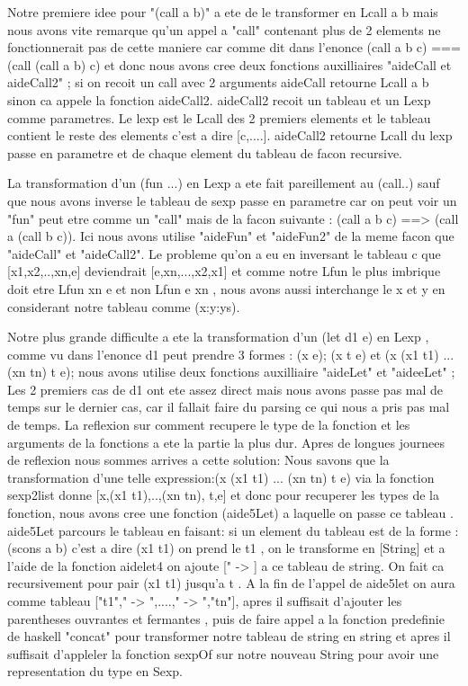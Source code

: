 \documentclass{article}
\begin{document}
Notre premiere idee pour "(call a b)" a ete de le transformer en Lcall a b mais nous avons vite remarque qu'un appel a "call" contenant plus de 2 elements ne fonctionnerait pas de cette maniere car comme dit dans l'enonce (call a b c) === (call (call a b) c)  et donc nous avons cree deux fonctions auxilliaires "aideCall et aideCall2" ; si on recoit un call avec 2 arguments aideCall retourne Lcall a b sinon ca appele la fonction aideCall2. aideCall2 recoit un tableau et un Lexp comme parametres. Le lexp est le Lcall des 2 premiers elements et le tableau contient le reste des elements c'est a dire [c,....]. aideCall2 retourne Lcall du lexp passe en parametre et de chaque element du tableau de facon recursive.  \vspace{.7 cm}

La transformation d'un (fun ...) en Lexp a ete fait pareillement au (call..) sauf que nous avons inverse le tableau de sexp passe en parametre car on peut voir un "fun" peut etre comme un "call" mais de la facon suivante : (call a b c) ==> (call a (call b c)). Ici nous avons utilise "aideFun" et "aideFun2" de la meme facon que "aideCall" et "aideCall2". Le probleme qu'on a eu en inversant le tableau c que [x1,x2,..,xn,e] deviendrait [e,xn,...,x2,x1] et comme notre Lfun le plus imbrique doit etre Lfun xn e et non Lfun e xn , nous avons aussi interchange le x et y en considerant notre tableau comme (x:y:ys). \vspace{.7 cm}

Notre plus grande difficulte a ete la transformation d'un (let d1 e) en Lexp , comme vu dans l'enonce d1 peut prendre 3 formes : (x e); (x t e) et (x (x1 t1) ... (xn tn) t e); nous avons utilise deux fonctions auxilliaire "aideLet" et "aideeLet" ; Les 2 premiers cas de d1 ont ete assez direct mais nous avons passe pas mal de temps sur le dernier cas, car il fallait faire du parsing ce qui nous a pris pas mal de temps. La reflexion sur comment recupere le type de la fonction et les arguments de la fonctions a ete la partie la plus dur. Apres de longues journees de reflexion nous sommes arrives a cette solution: 
Nous savons que la transformation d'une telle expression:(x (x1 t1) ... (xn tn) t e) via la fonction sexp2list donne [x,(x1 t1),..,(xn tn), t,e] et donc pour recuperer les types de la fonction, nous avons cree une fonction (aide5Let) a laquelle on passe ce tableau . aide5Let parcours le tableau en faisant: si un element du tableau est de la forme : (scons a b) c'est a dire (x1 t1) on prend le t1 , on le transforme en [String] et a l'aide de la fonction aidelet4 on ajoute [" -> ] a ce tableau de string. On fait ca recursivement pour pair (x1 t1) jusqu'a t . A la fin de l'appel de aide5let on aura comme tableau ["t1"," -> ",....," -> ","tn"], apres il suffisait d'ajouter les parentheses ouvrantes et fermantes , puis de faire appel a la fonction predefinie de haskell "concat" pour transformer notre tableau de string en string et apres il suffisait d'appleler la fonction sexpOf sur notre nouveau String pour avoir une representation du type en Sexp.
\end{document}
